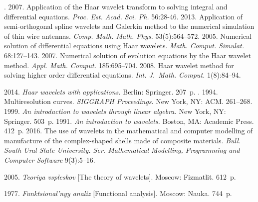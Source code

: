  \begin{multicols}{2}

\renewcommand{\bibname}{\protect\rmfamily References}

{\small\frenchspacing
 {%
 \begin{thebibliography}{99}

. 2007. Application of the
 Haar wavelet transform to solving integral and differential equations. 
 \textit{Proc. Est. Acad. Sci. Ph.} 56:28-46.
2013.  Application of semi-orthogonal spline wavelets and Galerkin
method to the numerical simulation of thin wire antennas. 
\textit{Comp. Math. Math. Phys.} 53(5):564--572.
 2005. Numerical solution of differential 
equations using Haar wavelets. \textit{Math. Comput. Simulat.} 68:127--143.
2007. Numerical solution of evolution equations by the 
Haar wavelet method. \textit{Appl. Math. Comput.} 185:695--704.
2008. Haar wavelet method for solving higher order differential equations. 
\textit{Int. J.~Math. Comput.} 1(8):84--94.

 2014. \textit{Haar wavelets 
with applications.}  Berlin: Springer. 207~p.
. 1994. 
{Multiresolution curves}. \textit{SIGGRAPH Proceedings}.  New York, NY: ACM. 261--268.
 1999. \textit{An introduction to wavelets through linear algebra.} 
New York, NY: Springer. 503~p.
 1991. \textit{An introduction to wavelets.} Boston, MA: 
Academic Press. 412~p.
 2016. 
The use of wavelets in the mathematical and computer modelling of manufacture 
of the complex-shaped shells made of composite materials.   
\textit{Bull. South Ural State University. Ser. Mathematical Modelling, 
Programming and Computer Software} 9(3):5--16.

2005. \textit{Teoriya vspleskov} [{The theory of wavelets}]. Moscow: Fizmatlit.  612~p.

 1977. \textit{Funktsional'nyy analiz} 
[{Functional analysis}]. Moscow: Nauka. 744~p.
\end{thebibliography}

 }
 }

\end{multicols}

